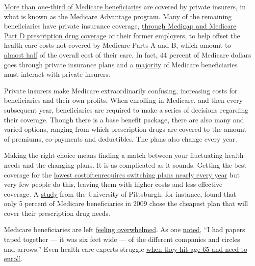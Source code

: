 \href{https://www.kff.org/medicare/issue-brief/a-dozen-facts-about-medicare-advantage/}{More
than one-third of Medicare beneficiaries} are covered by private
insurers, in what is known as the Medicare Advantage program. Many of
the remaining beneficiaries have private insurance coverage,
\href{https://www.kff.org/medicare/issue-brief/an-overview-of-medicare/}{through
Medigap and Medicare Part D prescription drug coverage} or their former
employers, to help offset the health care costs not covered by Medicare
Parts A and B, which amount to
\href{https://onlinelibrary.wiley.com/doi/full/10.1111/j.1475-5890.2016.12106}{almost
half} of the overall cost of their care. In fact, 44 percent of Medicare
dollars goes through private insurance plans and a
\href{https://www.kff.org/medicare/issue-brief/an-overview-of-medicare/}{majority}
of Medicare beneficiaries must interact with private insurers.

Private insurers make Medicare extraordinarily confusing, increasing
costs for beneficiaries and their own profits. When enrolling in
Medicare, and then every subsequent year, beneficiaries are required to
make a series of decisions regarding their coverage. Though there is a
base benefit package, there are also many and varied options, ranging
from which prescription drugs are covered to the amount of premiums,
co-payments and deductibles. The plans also change every year.

Making the right choice means finding a match between your fluctuating
health needs and the changing plans. It is as complicated as it sounds.
Getting the best coverage for the
\href{https://www.healthaffairs.org/doi/full/10.1377/hlthaff.2012.0087}{lowest
cost}\href{https://www.healthaffairs.org/doi/full/10.1377/hlthaff.2012.0087}{often}\href{https://www.healthaffairs.org/doi/full/10.1377/hlthaff.2012.0087}{requires
switching plans nearly every year} but very few people do this, leaving
them with higher costs and less effective coverage. A
\href{https://www.healthaffairs.org/doi/full/10.1377/hlthaff.2012.0087}{study}
from the University of Pittsburgh, for instance, found that only 5
percent of Medicare beneficiaries in 2009 chose the cheapest plan that
will cover their prescription drug needs.

Medicare beneficiaries are left
\href{https://www.healthaffairs.org/doi/full/10.1377/hlthaff.2011.0132}{feeling
overwhelmed}. As one
\href{https://www.kff.org/report-section/how-are-seniors-choosing-and-changing-health-insurance-plans-what-factors-lead-beneficiaries-to-not-be-enrolled-in-the-lowest-cost-health-plan/}{noted},
``I had papers taped together --- it was six feet wide --- of the
different companies and circles and arrows.'' Even health care experts
struggle
\href{https://www.healthnewsreview.org/2018/11/making-medicare-choices-in-a-marketplace-mess/}{when
they hit age 65 and need to enroll}.

